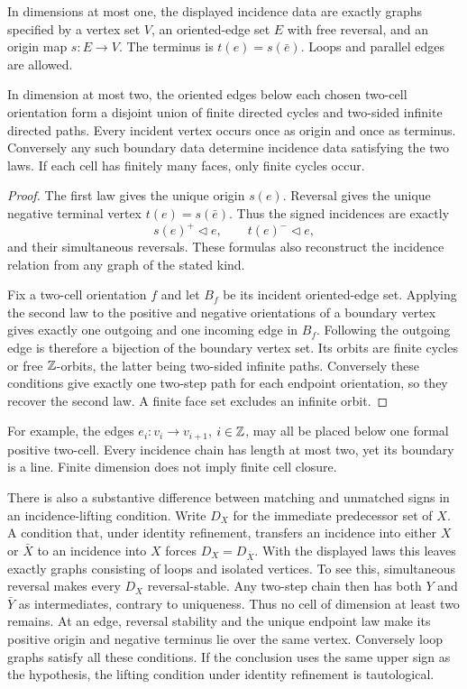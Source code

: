 \begin{proposition}\label{prop:lowdim-dictionary}
In dimensions at most one, the displayed incidence data are exactly
graphs specified by a vertex set $V$, an oriented-edge set $E$ with
free reversal, and an origin map $s:E\to V$. The terminus is
$t(e)=s(\bar e)$. Loops and parallel edges are allowed.

In dimension at most two, the oriented edges below each chosen
two-cell orientation form a disjoint union of finite directed cycles
and two-sided infinite directed paths. Every incident vertex occurs
once as origin and once as terminus. Conversely any such boundary
data determine incidence data satisfying the two laws. If each cell
has finitely many faces, only finite cycles occur.
\end{proposition}
\begin{proof}
The first law gives the unique origin $s(e)$. Reversal gives the
unique negative terminal vertex $t(e)=s(\bar e)$. Thus the signed
incidences are exactly
\[
 s(e)^+\triangleleft e,\qquad t(e)^-\triangleleft e,
\]
and their simultaneous reversals. These formulas also reconstruct
the incidence relation from any graph of the stated kind.

Fix a two-cell orientation $f$ and let $B_f$ be its incident
oriented-edge set. Applying the second law to the positive and
negative orientations of a boundary vertex gives exactly one
outgoing and one incoming edge in $B_f$. Following the outgoing
edge is therefore a bijection of the boundary vertex set.
Its orbits are finite cycles or free $\mathbb Z$-orbits, the latter
being two-sided infinite paths. Conversely these conditions give
exactly one two-step path for each endpoint orientation, so they
recover the second law. A finite face set excludes an infinite orbit.
\end{proof}
For example, the edges $e_i:v_i\to v_{i+1}$, $i\in\mathbb Z$, may
all be placed below one formal positive two-cell. Every incidence
chain has length at most two, yet its boundary is a line.
Finite dimension does not imply finite cell closure.

There is also a substantive difference between matching and
unmatched signs in an incidence-lifting condition. Write $D_X$ for
the immediate predecessor set of $X$. A condition that, under
identity refinement, transfers an incidence into either $X$ or
$\bar X$ to an incidence into $X$ forces
$D_X=D_{\bar X}$. With the displayed laws this leaves exactly
graphs consisting of loops and isolated vertices. To see this,
simultaneous reversal makes every $D_X$ reversal-stable. Any
two-step chain then has both $Y$ and $\bar Y$ as intermediates,
contrary to uniqueness. Thus no cell of dimension at least two
remains. At an edge, reversal stability and the unique endpoint
law make its positive origin and negative terminus lie over the
same vertex. Conversely loop graphs satisfy all these conditions.
If the conclusion uses the same upper sign as the hypothesis,
the lifting condition under identity refinement is tautological.


